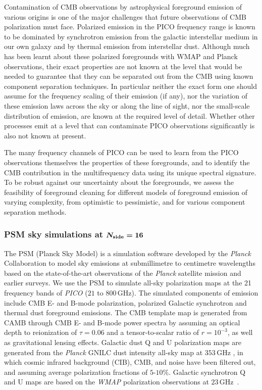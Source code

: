 \documentclass[PICOReport.tex]{subfiles}
\begin{document}
Contamination of CMB observations by astrophysical foreground emission of various origins is one of the major challenges that future observations of CMB polarization must face. Polarized emission in the PICO frequency range is known to be dominated by synchrotron emission from the galactic interstellar medium in our own galaxy and by thermal emission from interstellar dust. Although much has been learnt about these polarized foregrounds with WMAP and Planck observations, their exact properties are not known at the level that would be needed to guarantee that they can be separated out from the CMB using known component separation techniques. In particular neither the exact form one should assume for the frequency scaling of their emission (if any), nor the variation of these emission laws across the sky or along the line of sight, nor the small-scale distribution of emission, are known at the required level of detail. Whether other processes emit at a level that can contaminate PICO observations significantly is also not known at present. 

The many frequency channels of PICO can be used to learn from the PICO observations themselves the properties of these foregrounds, and to identify the CMB contribution in the multifrequency data using its unique spectral signature. To be robust against our uncertainty about the foregrounds, we assess the feasibility of foreground cleaning for different models of foreground emission of varying complexity, from optimistic to pessimistic, and for various component separation methods. 

\subsubsection{PSM sky simulations at $\boldsymbol{N_{\rm side}=16}$}

The PSM (Planck Sky Model) \cite{delabrouille/etal:2013} is a simulation software developed by the \emph{Planck} Collaboration  to model sky emissions at submillimetre to centimetre wavelengths based on the state-of-the-art observations of the \emph{Planck} satellite mission and earlier surveys. We use the {\sc PSM} to simulate all-sky polarization maps at the 21 frequency bands of \emph{PICO} ($21$ to $800$\,GHz). The simulated components of emission include CMB E- and B-mode polarization, polarized Galactic synchrotron and thermal dust foreground emissions. The CMB template map is generated from CAMB \cite{Lewis/etal:2000} through CMB E- and B-mode power spectra by assuming an optical depth to reionization of $\tau=0.06$ and a tensor-to-scalar ratio of $r = 10^{-3}$, as well as gravitational lensing effects. Galactic dust Q and U polarization maps are generated from the \emph{Planck} {\sc GNILC} 
dust intensity all-sky map at $353$\,GHz , in which cosmic infrared background (CIB), CMB, and noise have been filtered out, and assuming average polarization fractions of $5$-$10$\%. Galactic synchrotron Q and U maps are based on the \emph{WMAP} polarization observations at $23$\,GHz~\cite{Miville-Deschenes/etal:2008}. 
\end{document}
